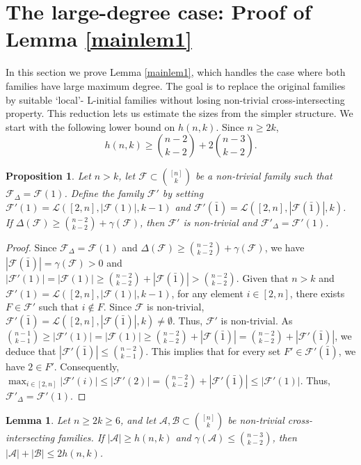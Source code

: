\documentclass[a4paper,11pt]{article}
\newtheorem{lemma}[theorem]{Lemma}
\newtheorem{proposition}[theorem]{Proposition}
\newcommand{\m}{\mathcal}
\begin{document}
\section{The large-degree case: Proof of Lemma \ref{mainlem1}}\label{sec:both-large}
In this section we prove Lemma \ref{mainlem1}, which handles the case where both families have large maximum degree. The goal is to replace the original families by suitable `local'- L-initial families without losing non-trivial cross-intersecting property. 
This reduction lets us estimate the sizes from the simpler structure.
We start with the following lower bound on $h(n,k)$.
 Since $n\ge 2k$,
\begin{equation}\label{hnk>}
    h(n,k)\ge {n-2\choose k-2}+2{n-3\choose k-2}.
\end{equation}



\begin{proposition}\label{1-20-1}
Let $n > k$, let $\m F\subset {[n]\choose k}$ be a non-trivial family such that $\m F_{\Delta}=\m F(1)$. Define the family $\m F'$ by  setting $\m F'(1)=\m L([2,n], |\m F(1)|, k-1)$ and $\m F'(\bar{1})=\m L([2,n], |\m F(\bar{1})|, k)$. 
If $\Delta(\m F)\ge {n-2\choose k-2}+\gamma(\m F)$, then $\m F'$ is non-trivial and $\m F'_{\Delta}=\m F'(1)$.
\end{proposition}

\begin{proof}
Since $\m F_{\Delta}=\m F(1)$ and $\Delta(\m F)\ge {n-2\choose k-2}+\gamma(\m F)$, we have $|\m F(\bar{1})|=\gamma(\m F)>0$ and
$|\m F'(1)|=|\m F(1)|\ge {n-2\choose k-2}+|\m F(\bar{1})|>{n-2\choose k-2}$. 
Given that $n>k$ and $\m F'(1)=\m L([2,n], |\m F(1)|, k-1)$, for any element $i\in [2,n]$, there exists $F\in \m F'$ such that $i\not\in F$. 
Since $\m F$ is non-trivial, $\m F'(\bar{1})=\m L([2,n], |\m F(\bar{1})|, k)\ne \emptyset$. 
Thus,  $\m F'$ is non-trivial. 
As ${n-1\choose k-1}\ge |\m F'(1)|=|\m F(1)|\ge {n-2\choose k-2}+|\m F(\bar{1})|={n-2\choose k-2}+|\m F'(\bar{1})|$, 
we deduce that $|\m F'(\bar{1})|\le {n-2\choose k-1}$. This implies that
for every set $F'\in \m F'(\bar{1})$,  we have $2\in F'$. Consequently, 
$\max_{i\in [2,n]}|\m F'(i)|\le |\m F'(2)|={n-2\choose k-2}+|\m F'(\bar{1})|\le |\m F'(1)|$. Thus, $\m F'_{\Delta}=\m F'(1)$.
\end{proof}



\begin{lemma}\label{1-21-1}
Let $n\ge2k\ge 6$, and let $\m A, \m B \subset {[n]\choose k}$ be non-trivial cross-intersecting families. If $|\m A|\ge h(n,k)$ and $\gamma(\m A)\le {n-3\choose k-2}$, then
$|\m A|+|\m B|\le 2h(n,k)$. 
\end{lemma}
\end{document}
